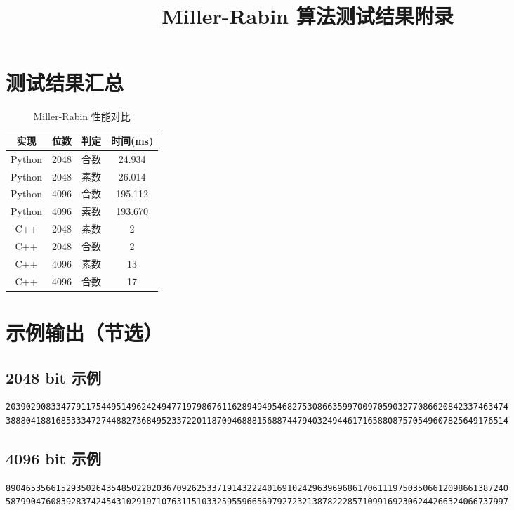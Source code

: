 \documentclass[12pt]{article}
\title{Miller-Rabin 算法测试结果附录}
\date{}
\begin{document}
\maketitle

\section*{测试结果汇总}

\begin{table}[htbp]
\centering
\begin{tabular}{cccc}
\toprule
实现 & 位数 & 判定 & 时间(ms) \\
\midrule
Python & 2048 & 合数 & 24.934 \\
Python & 2048 & 素数 & 26.014 \\
Python & 4096 & 合数 & 195.112 \\
Python & 4096 & 素数 & 193.670 \\
C++ & 2048 & 素数 & 2 \\
C++ & 2048 & 合数 & 2 \\
C++ & 4096 & 素数 & 13 \\
C++ & 4096 & 合数 & 17 \\
\bottomrule
\end{tabular}
\caption{Miller-Rabin 性能对比}
\end{table}

\section*{示例输出（节选）}

\subsection*{2048 bit 示例}
\begin{lstlisting}[style=numstyle]
2039029083347791175449514962424947719798676116289494954682753086635997009705903277086620842337463474
3888041881685333472744882736849523372201187094688815688744794032494461716588087570549607825649176514
\end{lstlisting}

\subsection*{4096 bit 示例}
\begin{lstlisting}[style=numstyle]
8904653566152935026435485022020367092625337191432224016910242963969686170611197503506612098661387240
5879904760839283742454310291971076311510332595596656979272321387822285710991692306244266324066737997
\end{lstlisting}
\end{document}
